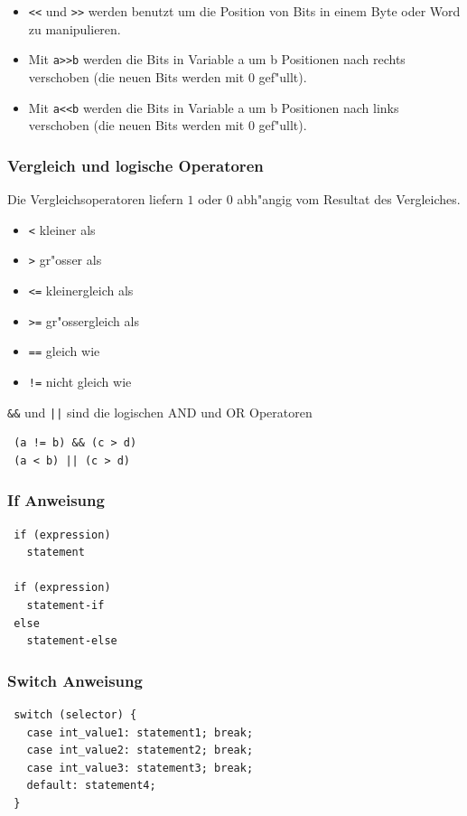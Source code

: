 \documentclass[german, 10pt, a4paper, twocolumn]{scrartcl}
\begin{document}
\begin{itemize}
	\item \verb#<<# und \verb#>># werden benutzt um die Position von Bits in einem Byte oder Word zu manipulieren.
	\item Mit \verb#a>>b# werden die Bits in Variable a um b Positionen nach rechts verschoben (die neuen Bits werden mit $0$ gef"ullt).
	\item Mit \verb#a<<b# werden die Bits in Variable a um b Positionen nach links verschoben (die neuen Bits werden mit $0$ gef"ullt).
\end{itemize}

\subsubsection{Vergleich und logische Operatoren}

Die Vergleichsoperatoren liefern $1$ oder $0$ abh"angig vom Resultat des Vergleiches.
\begin{itemize}
	\item \verb#<# kleiner als
	\item \verb#># gr"osser als
	\item \verb#<=# kleinergleich als
	\item \verb#>=# gr"ossergleich als
	\item \verb#==# gleich wie
	\item \verb#!=# nicht gleich wie
\end{itemize}

\verb#&&# und \verb#||# sind die logischen AND und OR Operatoren
\begin{verbatim}
 (a != b) && (c > d)
 (a < b) || (c > d)
\end{verbatim}

\subsubsection{If Anweisung}

\begin{verbatim}
 if (expression)
   statement

 if (expression)
   statement-if
 else
   statement-else
\end{verbatim}

\subsubsection{Switch Anweisung}

\begin{verbatim}
 switch (selector) {
   case int_value1: statement1; break;
   case int_value2: statement2; break;
   case int_value3: statement3; break;
   default: statement4;
 }
\end{verbatim}
\end{document}
